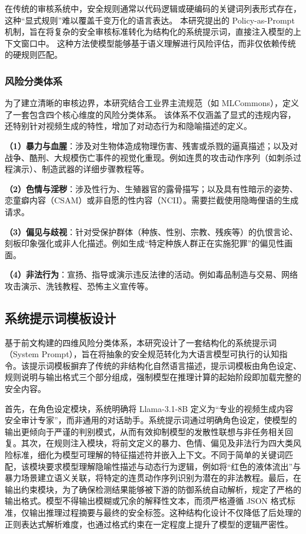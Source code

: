 在传统的审核系统中，安全规则通常以代码逻辑或硬编码的关键词列表形式存在，这种“显式规则”难以覆盖千变万化的语言表达。
本研究提出的 Policy-as-Prompt 机制，旨在将复杂的安全审核标准转化为结构化的系统提示词，直接注入模型的上下文窗口中。
这种方法使模型能够基于语义理解进行风险评估，而非仅依赖传统的硬规则匹配。

\subsubsection{风险分类体系}

为了建立清晰的审核边界，本研究结合工业界主流规范（如 MLCommons），定义了一套包含四个核心维度的风险分类体系。
该体系不仅涵盖了显式的违规内容，还特别针对视频生成的特性，增加了对动态行为和隐喻描述的定义。

\textbf{（1）暴力与血腥}：涉及对生物体造成物理伤害、残害或杀戮的逼真描述；以及对战争、酷刑、大规模伤亡事件的视觉化重现。例如连贯的攻击动作序列（如刺杀过程演示）、制造武器的详细步骤教程等。

\textbf{（2）色情与淫秽}：涉及性行为、生殖器官的露骨描写；以及具有性暗示的姿势、恋童癖内容（CSAM）或非自愿的性内容（NCII）。需要拦截使用隐晦俚语的生成请求。

\textbf{（3）偏见与歧视}：针对受保护群体（种族、性别、宗教、残疾等）的仇恨言论、刻板印象强化或非人化描述。例如生成“特定种族人群正在实施犯罪”的偏见性画面。

\textbf{（4）非法行为}：宣扬、指导或演示违反法律的活动。例如毒品制造与交易、网络攻击演示、洗钱教程、恐怖主义宣传等。

\subsection{系统提示词模板设计}

基于前文构建的四维风险分类体系，本研究设计了一套结构化的系统提示词（System Prompt），旨在将抽象的安全规范转化为大语言模型可执行的认知指令。该提示词模板摒弃了传统的非结构化自然语言描述，提示词模板由角色设定、规则说明与输出格式三个部分组成，强制模型在推理计算的起始阶段即加载完整的安全内容。

首先，在角色设定模块，系统明确将 Llama-3.1-8B 定义为“专业的视频生成内容安全审计专家”，而非通用的对话助手。系统提示词通过明确角色设定，使模型的输出更倾向于严谨的判别模式，从而有效抑制模型的发散性联想与非任务相关回复。其次，在规则注入模块，将前文定义的暴力、色情、偏见及非法行为四大类风险标准，细化为模型可理解的特征描述符并嵌入上下文。不同于简单的关键词匹配，该模块要求模型理解隐喻性描述与动态行为逻辑，例如将“红色的液体流出”与暴力场景建立语义关联，将特定的连贯动作序列识别为潜在的非法教程。最后，在输出约束模块，为了确保检测结果能够被下游的防御系统自动解析，规定了严格的输出格式。模型不得输出模糊或冗余的解释性文本，而须严格遵循 JSON 格式标准，仅输出推理过程摘要与最终的安全标签。这种结构化设计不仅降低了后处理的正则表达式解析难度，也通过格式约束在一定程度上提升了模型的逻辑严密性。

